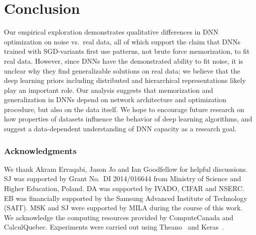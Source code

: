 \documentclass{article}
\begin{document}
\section{Conclusion}

Our empirical exploration demonstrates qualitative differences in DNN optimization on noise vs.~real data, all of which support the claim that DNNs trained with SGD-variants first use patterns, not brute force memorization, to fit real data. 
However, since DNNs have the demonstrated ability to fit noise, it is unclear why they find generalizable solutions on real data; we believe that the deep learning priors including distributed and hierarchical representations likely play an important role.
Our analysis suggests that memorization and generalization in DNNs depend on network architecture and optimization procedure, but also on the data itself.
We hope to encourage future research on how properties of datasets influence the behavior of deep learning algorithms, and suggest a data-dependent understanding of DNN capacity as a research goal.




\subsubsection*{Acknowledgments}
We thank Akram Erraqabi, Jason Jo and Ian Goodfellow for helpful discussions. 
SJ was supported by Grant No.~DI 2014/016644 from Ministry of Science and Higher Education, Poland. DA was supported by IVADO, CIFAR and NSERC.
EB was financially supported by the Samsung Advanced Institute of Technology (SAIT).
MSK and SJ were supported by MILA during the course of this work.
We acknowledge the computing resources provided by ComputeCanada and CalculQuebec.
Experiments were carried out using Theano~\citep{theano} and Keras~\citep{keras}. 
    


\end{document}
